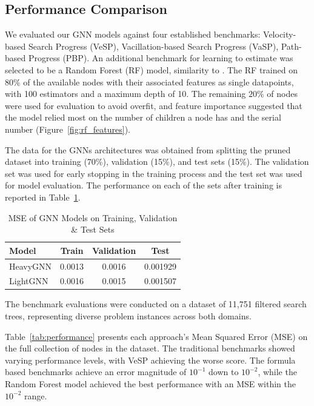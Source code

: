 \documentclass[letterpaper]{article}
\begin{document}
\subsection{Performance Comparison}

We evaluated our GNN models against four established benchmarks: Velocity-based Search Progress (VeSP), Vacillation-based Search Progress (VaSP), Path-based Progress (PBP). An additional benchmark for learning to estimate was selected to be a Random Forest (RF) model, similarity to \citet{sudry2022learning}.
The RF trained on $80\%$ of the available nodes with their associated features as single datapoints, with 100 estimators and a maximum depth of 10. The remaining $20\%$ of nodes were used for evaluation to avoid overfit, and feature importance suggested that the model relied most on the number of children a node has and the serial number (Figure~\ref{fig:rf_features}).

The data for the GNNs architectures was obtained from splitting the pruned dataset into training (70\%), validation (15\%), and test sets (15\%). The validation set was used for early stopping in the training process and the test set was used for model evaluation. The performance on each of the sets after training is reported in Table~\ref{tab:train-test}.

\begin{table}[t]
    \centering
    \caption{MSE of GNN Models on Training, Validation \& Test Sets}
    \label{tab:train-test}
    \begin{tabular}{|l|c|c|c|}
    \hline
    \textbf{Model} & \textbf{Train} & \textbf{Validation} & \textbf{Test} \\
    \hline
    HeavyGNN & 0.0013 & 0.0016 & 0.001929 \\
    LightGNN & 0.0016 & 0.0015 & 0.001507 \\
    \hline
    \end{tabular}
\end{table}

The benchmark evaluations were conducted on a dataset of 11,751 filtered search trees, representing diverse problem instances across both domains.

Table~\ref{tab:performance} presents each approach's Mean Squared Error (MSE) on the full collection of nodes in the dataset. The traditional benchmarks showed varying performance levels, with VeSP achieving the worse score. The formula based benchmarks achieve an error magnitude of $10^{-1}$ down to $10^{-2}$, while the Random Forest model achieved the best performance with an MSE within the $10^{-2}$ range.
\end{document}
